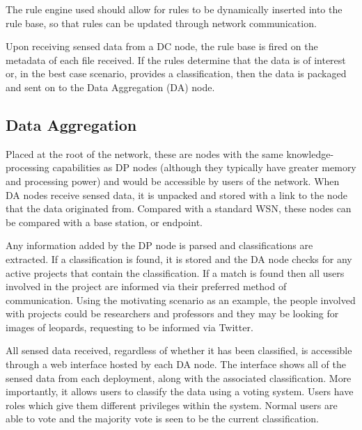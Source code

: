 	The rule engine used should allow for rules to be dynamically inserted into the rule base, so that rules can be updated through network communication.

	Upon receiving sensed data from a DC node, the rule base is fired on the metadata of each file received. If the rules determine that the data is of interest or, in the best case scenario, provides a classification, then the data is packaged and sent on to the Data Aggregation (DA) node.
	
	\subsection{Data Aggregation}
	Placed at the root of the network, these are nodes with the same knowledge-processing capabilities as DP nodes (although they typically have greater memory and processing power) and would be accessible by users of the network. When DA nodes receive sensed data, it is unpacked and stored with a link to the node that the data originated from. Compared with a standard WSN, these nodes can be compared with a base station, or endpoint.
	
	Any information added by the DP node is parsed and classifications are extracted. If a classification is found, it is stored and the DA node checks for any active projects that contain the classification. If a match is found then all users involved in the project are informed via their preferred method of communication. Using the motivating scenario as an example, the people involved with projects could be researchers and professors and they may be looking for images of leopards, requesting to be informed via Twitter.
	
	All sensed data received, regardless of whether it has been classified, is accessible through a web interface hosted by each DA node. The interface shows all of the sensed data from each deployment, along with the associated classification. More importantly, it allows users to classify the data using a voting system. Users have roles which give them different privileges within the system. Normal users are able to vote and the majority vote is seen to be the current classification.
	

